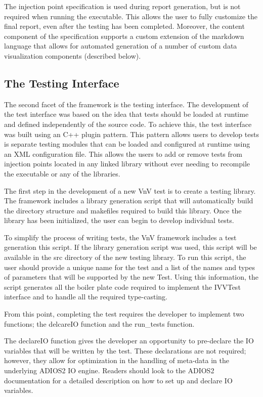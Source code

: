 The injection point specification is used during report generation, but is not required when running the executable. This
allows the user to fully customize the final report, even after the \VV testing has been completed. Moreover, the content
component of the specification supports a custom extension of the markdown language that allows for automated generation
of a number of custom data visualization components (described below). 

\subsection{The Testing Interface} 

The second facet of the framework is the \VV testing interface. The development of the 
test interface was based on the idea that tests should be loaded at runtime and defined independently of the source code. To achieve this, the test
interface was built using an C++ plugin pattern. This pattern allows users to develop tests is separate testing modules that can be loaded and configured 
at runtime using an XML configuration file. This allows the users to add or remove tests from injection points located in any linked library without ever 
needing to recompile the executable or any of the libraries. 

The first step in the development of a new VnV test is to create a testing library. The framework includes a library generation script that will automatically build the directory structure and makefiles required to 
build this library. Once the library has been initialized, the user can begin to develop individual tests. 

To simplify the process of writing tests, the VnV framework includes a test generation this script. If the library generation script was used, this script will be available in the src directory of the new testing library. To run this script, the user should provide a unique name for the test and a list of the names and types of parameters that will be supported by the new Test. Using this information, the script generates all the boiler plate code required to implement the IVVTest interface and to handle all the required type-casting. 

From this point, completing the test requires the developer to implement two functions; the delcareIO function and the run\_tests function. 

The declareIO function gives the developer an opportunity to pre-declare the IO variables that will be written by the test. These declarations are not required; however, they allow for optimization in the handling of meta-data in the underlying ADIOS2 IO engine. Readers should look to the ADIOS2 documentation for a detailed description on how to set up and declare IO variables. 

